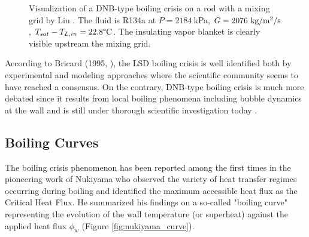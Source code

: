 \begin{figure}[!h]
\centering
{}
\caption{Visualization of a DNB-type boiling crisis on a rod with a mixing grid by Liu \etal \cite{liu_critical_2021}. The fluid is R134a at $P=2184~$kPa, $G = 2076~\text{kg/m$^{2}$/s}$ , $T_{sat} - T_{L,in} = 22.8 \degree\mathrm{C}$. The insulating vapor blanket is clearly visible upstream the mixing grid.}
\label{fig:dnb_liu}
\end{figure}

\npar

According to Bricard (1995, \cite{bricard_modelisation_1995}), the LSD boiling crisis is well identified both by experimental and modeling approaches \cite{hewitt_phenomenological_1990} where the scientific community seems to have reached a consensus. On the contrary, DNB-type boiling crisis is much more debated since it results from local boiling phenomena including bubble dynamics at the wall and is still under thorough scientific investigation today \cite{kossolapov_experimental_2021, demarly_new_2020, richenderfer_experimental_2018, bloch_study_2016, bloch_phenomenological_2013}.


\subsection{Boiling Curves}

The boiling crisis phenomenon has been reported among the first times in the pioneering work of Nukiyama \cite{nukiyama_maximum_1966} who observed the variety of heat transfer regimes occurring during boiling and identified the maximum accessible heat flux as the Critical Heat Flux. He summarized his findings on a so-called "boiling curve" representing the evolution of the wall temperature (or superheat) against the applied heat flux $\phi_{w}$ (Figure \ref{fig:nukiyama_curve}).


